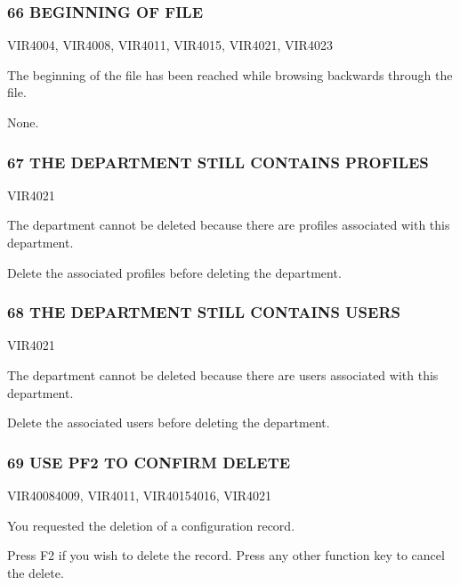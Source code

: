 \documentclass[letterpaper,10pt,english]{sphinxmanual}
\begin{document}
\subsubsection{66 BEGINNING OF FILE}
\label{\detokenize{messages:beginning-of-file}}\begin{description}
\sphinxAtStartPar
VIR4004, VIR4008, VIR4011, VIR4015, VIR4021, VIR4023

\sphinxAtStartPar
The beginning of the file has been reached while browsing backwards through the file.

\sphinxAtStartPar
None.

\end{description}


\subsubsection{67 THE DEPARTMENT STILL CONTAINS PROFILES}
\label{\detokenize{messages:the-department-still-contains-profiles}}\begin{description}
\sphinxAtStartPar
VIR4021

\sphinxAtStartPar
The department cannot be deleted because there are profiles associated with this department.

\sphinxAtStartPar
Delete the associated profiles before deleting the department.

\end{description}


\subsubsection{68 THE DEPARTMENT STILL CONTAINS USERS}
\label{\detokenize{messages:the-department-still-contains-users}}\begin{description}
\sphinxAtStartPar
VIR4021

\sphinxAtStartPar
The department cannot be deleted because there are users associated with this department.

\sphinxAtStartPar
Delete the associated users before deleting the department.

\end{description}


\subsubsection{69 USE PF2 TO CONFIRM DELETE}
\label{\detokenize{messages:use-pf2-to-confirm-delete}}\begin{description}
\sphinxAtStartPar
VIR4008\sphinxhyphen{}4009, VIR4011, VIR4015\sphinxhyphen{}4016, VIR4021

\sphinxAtStartPar
You requested the deletion of a configuration record.

\sphinxAtStartPar
Press F2 if you wish to delete the record. Press any other function key to cancel the delete.

\end{description}
\end{document}
